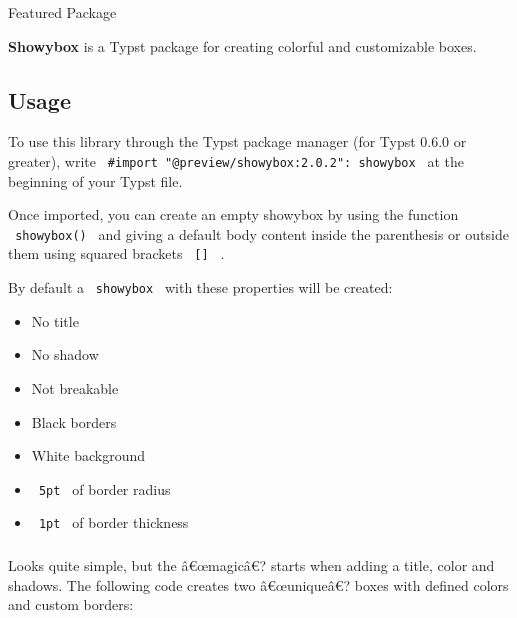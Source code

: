{ } Featured Package

\label{readme}
\textbf{Showybox} is a Typst package for creating colorful and
customizable boxes.

\subsection{Usage}\label{usage}

To use this library through the Typst package manager (for Typst 0.6.0
or greater), write
\texttt{\ \#import\ "@preview/showybox:2.0.2":\ showybox\ } at the
beginning of your Typst file.

Once imported, you can create an empty showybox by using the function
\texttt{\ showybox()\ } and giving a default body content inside the
parenthesis or outside them using squared brackets \texttt{\ {[}{]}\ } .

By default a \texttt{\ showybox\ } with these properties will be
created:

\begin{itemize}
\tightlist
\item
  No title
\item
  No shadow
\item
  Not breakable
\item
  Black borders
\item
  White background
\item
  \texttt{\ 5pt\ } of border radius
\item
  \texttt{\ 1pt\ } of border thickness
\end{itemize}

\begin{Shaded}
\begin{Highlighting}[]

\NormalTok{)}
\end{Highlighting}
\end{Shaded}

\subsubsection{\texorpdfstring{\protect{}}{Hello world! example}}\label{hello-world-example}

Looks quite simple, but the â€œmagicâ€? starts when adding a title,
color and shadows. The following code creates two â€œuniqueâ€? boxes
with defined colors and custom borders:

